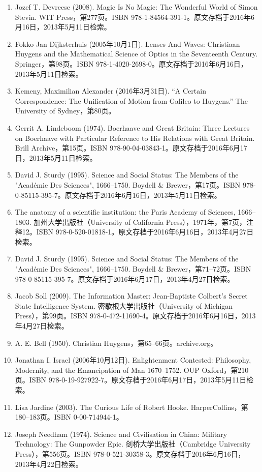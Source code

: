 \begin{enumerate}
\item Jozef T. Devreese (2008). Magic Is No Magic: The Wonderful World of Simon Stevin. WIT Press，第277页。ISBN 978-1-84564-391-1。原文存档于2016年6月16日，2013年5月11日检索。
\item Fokko Jan Dijksterhuis (2005年10月1日). Lenses And Waves: Christiaan Huygens and the Mathematical Science of Optics in the Seventeenth Century. Springer，第98页。ISBN 978-1-4020-2698-0。原文存档于2016年6月16日，2013年5月11日检索。
\item Kemeny, Maximilian Alexander (2016年3月31日). “A Certain Correspondence: The Unification of Motion from Galileo to Huygens.” The University of Sydney，第80页。
\item Gerrit A. Lindeboom (1974). Boerhaave and Great Britain: Three Lectures on Boerhaave with Particular Reference to His Relations with Great Britain. Brill Archive，第15页。ISBN 978-90-04-03843-1。原文存档于2016年6月17日，2013年5月11日检索。
\item David J. Sturdy (1995). Science and Social Status: The Members of the "Académie Des Sciences", 1666–1750. Boydell & Brewer，第17页。ISBN 978-0-85115-395-7。原文存档于2016年6月16日，2013年5月11日检索。
\item The anatomy of a scientific institution: the Paris Academy of Sciences, 1666–1803. 加州大学出版社（University of California Press），1971年，第7页，注释12。ISBN 978-0-520-01818-1。原文存档于2016年6月16日，2013年4月27日检索。
\item David J. Sturdy (1995). Science and Social Status: The Members of the "Académie Des Sciences", 1666–1750. Boydell & Brewer，第71–72页。ISBN 978-0-85115-395-7。原文存档于2016年6月17日，2013年4月27日检索。
\item Jacob Soll (2009). The Information Master: Jean-Baptiste Colbert's Secret State Intelligence System. 密歇根大学出版社（University of Michigan Press），第99页。ISBN 978-0-472-11690-4。原文存档于2016年6月16日，2013年4月27日检索。
\item A. E. Bell (1950). Christian Huygens，第65–66页。archive.org。
\item Jonathan I. Israel (2006年10月12日). Enlightenment Contested: Philosophy, Modernity, and the Emancipation of Man 1670–1752. OUP Oxford，第210页。ISBN 978-0-19-927922-7。原文存档于2016年6月17日，2013年5月11日检索。
\item Lisa Jardine (2003). The Curious Life of Robert Hooke. HarperCollins，第180–183页。ISBN 0-00-714944-1。
\item Joseph Needham (1974). Science and Civilisation in China: Military Technology: The Gunpowder Epic. 剑桥大学出版社（Cambridge University Press），第556页。ISBN 978-0-521-30358-3。原文存档于2016年6月16日，2013年4月22日检索。

\end{enumerate}
